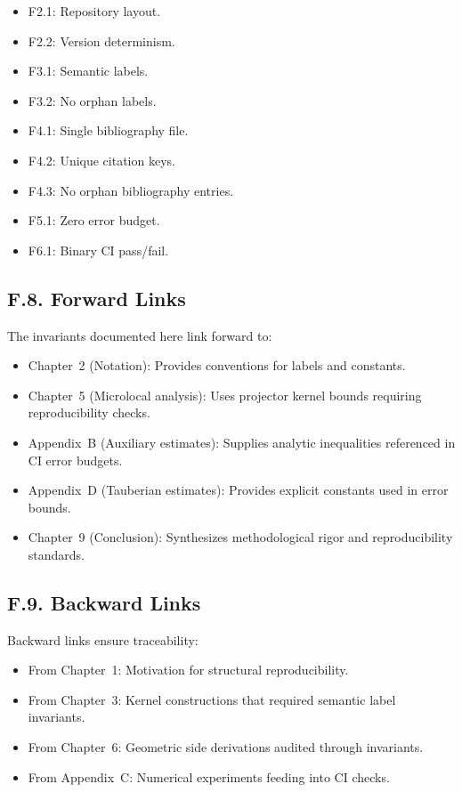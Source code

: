 \begin{itemize}
    \item F2.1: Repository layout.
    \item F2.2: Version determinism.
    \item F3.1: Semantic labels.
    \item F3.2: No orphan labels.
    \item F4.1: Single bibliography file.
    \item F4.2: Unique citation keys.
    \item F4.3: No orphan bibliography entries.
    \item F5.1: Zero error budget.
    \item F6.1: Binary CI pass/fail.
\end{itemize}

\subsection*{F.8. Forward Links}

The invariants documented here link forward to:
\begin{itemize}
    \item Chapter~2 (Notation): Provides conventions for labels and constants.
    \item Chapter~5 (Microlocal analysis): Uses projector kernel bounds requiring reproducibility checks.
    \item Appendix~B (Auxiliary estimates): Supplies analytic inequalities referenced in CI error budgets.
    \item Appendix~D (Tauberian estimates): Provides explicit constants used in error bounds.
    \item Chapter~9 (Conclusion): Synthesizes methodological rigor and reproducibility standards.
\end{itemize}

\subsection*{F.9. Backward Links}

Backward links ensure traceability:
\begin{itemize}
    \item From Chapter~1: Motivation for structural reproducibility.
    \item From Chapter~3: Kernel constructions that required semantic label invariants.
    \item From Chapter~6: Geometric side derivations audited through invariants.
    \item From Appendix~C: Numerical experiments feeding into CI checks.
\end{itemize}

